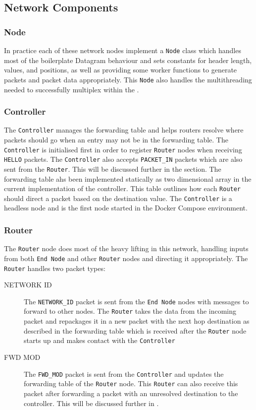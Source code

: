 \documentclass{article}
\newcommand{\code}[1]{\texttt{#1}}
\begin{document}
\subsection{Network Components}
\subsubsection{Node}
\label{subsec:Node}
In practice each of these network nodes implement a \code{Node} class which handles most of the boilerplate Datagram behaviour and sets constants for header length, values, and positions, as well as providing some worker functions to generate packets and packet data appropriately. This \code{Node} also handles the multithreading needed to successfully multiplex within the \code{}.

\subsubsection{Controller}
\label{subsec:Controller}
The \code{Controller} manages the forwarding table and helps routers resolve where packets should go when an entry may not be in the forwarding table. The \code{Controller} is initialised first in order to register \code{Router} nodes when receiving \code{HELLO} packets. The \code{Controller} also accepts \code{PACKET\_IN} packets which are also sent from the \code{Router}. This will be discussed further in the  section. The forwarding table ahs been implemented statically as two dimensional array in the current implementation of the controller. This table outlines how each \code{Router} should direct a packet based on the destination value. The \code{Controller} is a headless node and is the first node started in the Docker Compose environment.

\subsubsection{Router}
\label{subsec:Router}
The \code{Router} node does most of the heavy lifting in this network, handling inputs from both \code{End Node} and other \code{Router} nodes and directing it appropriately. The \code{Router} handles two packet types:
\begin{description}
  \item[NETWORK ID] The \code{NETWORK\_ID} packet is sent from the \code{End Node} nodes with messages to forward to other nodes. The \code{Router} takes the data from the incoming packet and repackages it in a new packet with the next hop destination as described in the forwarding table which is received after the \code{Router} node starts up and makes contact with the \code{Controller}
  \item[FWD MOD] The \code{FWD\_MOD} packet is sent from the \code{Controller} and updates the forwarding table of the \code{Router} node. This \code{Router} can also receive this packet after forwarding a packet with an unresolved destination to the controller. This will be discussed further in .
\end{description}
\end{document}
